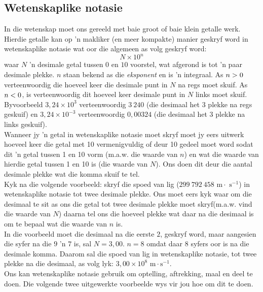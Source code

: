 \subsection*{Wetenskaplike notasie}
In die wetenskap moet ons gereeld met baie groot of baie klein getalle werk. Hierdie getalle kan op  'n makliker (en meer kompakte) manier geskryf word in wetenskaplike notasie wat oor die algemeen as volg geskryf word:      
    \begin{equation*}
    N \times 10^{n}
      \end{equation*}
waar $N$  'n desimale getal tussen $0$ en $10$ voorstel, wat afgerond is tot  'n paar desimale plekke. $n$ staan bekend as die \textsl{eksponent} en is  'n integraal. As $n>{}0$ verteenwoordig die hoeveel keer die desimale punt in $N$ na regs moet skuif. As $n<{}0$, is verteenwoordig dit hoeveel keer desimale punt in $N$ links moet skuif. Byvoorbeeld $3,24\ensuremath{\times}{10}^{3}$ verteenwoordig $3~240$ (die desimaal het 3 plekke na regs geskuif) en $3,24\ensuremath{\times}{10}^{-3}$ verteenwoordig $0,00324$ (die desimaal het 3 plekke na links geskuif).\\
Wanneer jy  'n getal in wetenskaplike notasie moet skryf moet jy eers uitwerk hoeveel keer die getal met 10 vermenigvuldig of deur 10 gedeel moet word sodat dit  'n getal tussen 1 en 10 vorm (m.a.w. die waarde van $n$) en wat die waarde van hierdie getal tussen 1 en 10 is (die waarde van $N$). Ons doen dit deur die aantal desimale plekke wat die komma skuif te tel.\\
Kyk na die volgende voorbeeld: skryf die spoed van lig ($299 ~792 ~458 \text{ m} \cdot \text{ s}^{-1}$) in wetenskaplike notasie tot twee desimale plekke. Ons moet eers kyk waar om die desimaal te sit as ons die getal tot twee desimale plekke moet skryf(m.a.w. vind die waarde van $N$) daarna tel ons die hoeveel plekke wat daar na die desimaal is om te bepaal wat die waarde van $n$ is.\\
In die voorbeeld moet die desimaal na die eerste $2$, geskryf word, maar aangesien die syfer na die $9$ 'n $7$ is, sal $N=3,00$. $n=8$ omdat daar $8$ syfers oor is na die desimale komma. Daarom sal die spoed van lig in wetenskaplike notasie, tot twee plekke na die desimaal, as volg lyk: $3,00 \times 10^{8} \text{ m} \cdot \text{s}^{-1}$. \\
Ons kan wetenskaplike notasie gebruik om optelling, aftrekking, maal en deel te doen. Die volgende twee uitgewerkte voorbeelde wys vir jou hoe om dit te doen.
